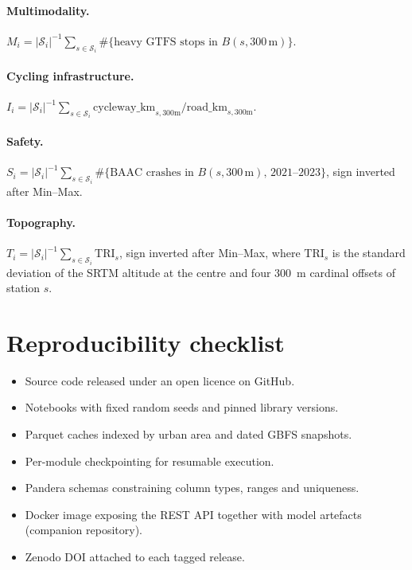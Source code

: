 \documentclass[11pt,a4paper]{article}
\begin{document}
\paragraph{Multimodality.}
$M_i = |\mathcal{S}_i|^{-1} \sum_{s \in \mathcal{S}_i}
        \#\{\text{heavy GTFS stops in } B(s, 300\,\text{m})\}$.

\paragraph{Cycling infrastructure.}
$I_i = |\mathcal{S}_i|^{-1} \sum_{s \in \mathcal{S}_i}
        \text{cycleway\_km}_{s,300\text{m}} /
        \text{road\_km}_{s,300\text{m}}$.

\paragraph{Safety.}
$S_i = |\mathcal{S}_i|^{-1} \sum_{s \in \mathcal{S}_i}
        \#\{\text{BAAC crashes in } B(s, 300\,\text{m}),\,
        2021\text{--}2023\}$, sign inverted after Min--Max.

\paragraph{Topography.}
$T_i = |\mathcal{S}_i|^{-1} \sum_{s \in \mathcal{S}_i}
        \mathrm{TRI}_s$, sign inverted after Min--Max, where
$\mathrm{TRI}_s$ is the standard deviation of the SRTM altitude
at the centre and four 300~m cardinal offsets of station $s$.

\section{Reproducibility checklist}
\label{app:repro}

\begin{itemize}
\item Source code released under an open licence on GitHub.
\item Notebooks with fixed random seeds and pinned library
  versions.
\item Parquet caches indexed by urban area and dated GBFS
  snapshots.
\item Per-module checkpointing for resumable execution.
\item Pandera schemas constraining column types, ranges and
  uniqueness.
\item Docker image exposing the REST API together with model
  artefacts (companion repository).
\item Zenodo DOI attached to each tagged release.
\end{itemize}


\end{document}
